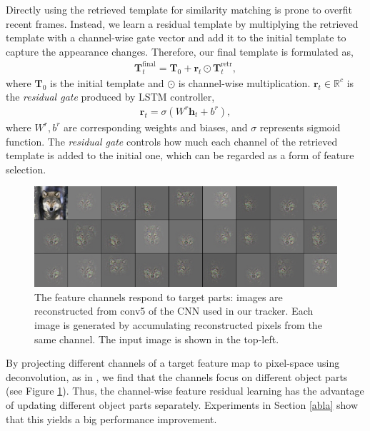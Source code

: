 \documentclass[runningheads]{llncs}
\begin{document}
Directly using the retrieved template for similarity matching  is prone to overfit recent frames.
Instead, we learn a residual template by multiplying the retrieved template with a channel-wise gate vector and add it to the initial template to capture the appearance changes. Therefore, our final template is formulated as,
\begin{align}
\mathbf{T}^{\text{final}}_t = \mathbf{T}_0+ \mathbf{r}_t\odot \mathbf{T}^{\text{retr}}_t,
\end{align}
where $\mathbf{T}_0$ is the initial template and  $\odot$ is channel-wise multiplication.
%
$\mathbf{r}_t\in \mathbb{R}^c$ is the \textit{residual gate} produced by LSTM controller, 
\begin{align}
\mathbf{r}_t = \sigma (W^r\mathbf{h}_{t}+b^r),
\end{align}
where $W^r, b^r$ are corresponding weights and biases, and $\sigma$ represents sigmoid function. 
The \textit{residual gate} controls how much each channel of the retrieved template is added to the initial one, which can be regarded as a form of feature selection. 

\begin{figure}[t]
	\begin{center}
		\includegraphics[width=0.65\linewidth]{figs/channel2.jpg}
	\end{center}
	\caption{The feature channels respond to target parts: images are reconstructed from conv5 of the CNN used in our tracker. Each image is generated by accumulating reconstructed pixels from the same channel. The input image is shown in the top-left. }
	\label{fig:6}
\end{figure}

By projecting different channels of a target feature map to pixel-space using deconvolution, as in \cite{Zeiler2014}, we find that the channels focus on different object parts (see Figure \ref{fig:6}). %
Thus, the channel-wise feature residual learning has the advantage of updating different object parts separately. Experiments in Section \ref{abla} show that this yields a big performance improvement. 
\end{document}
